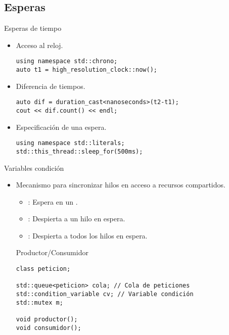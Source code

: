 \subsection{Esperas}

\begin{frame}[t,fragile]{Esperas de tiempo}
\begin{itemize}
  \item Acceso al reloj.
\begin{lstlisting}
using namespace std::chrono;
auto t1 = high_resolution_clock::now();
\end{lstlisting}
  \item Diferencia de tiempos.
\begin{lstlisting}
auto dif = duration_cast<nanoseconds>(t2-t1);
cout << dif.count() << endl;
\end{lstlisting}
  \item Especificación de una espera.
\begin{lstlisting}
using namespace std::literals;
std::this_thread::sleep_for(500ms);
\end{lstlisting}
\end{itemize}
\end{frame}

\begin{frame}[t,fragile]{Variables condición}
\begin{itemize}
  \item Mecanismo para sincronizar hilos en acceso a recursos compartidos.
    \begin{itemize}
      \item {}: Espera en un .
      \item {}: Despierta a un hilo en espera.
      \item {}: Despierta a todos los hilos en espera.
    \end{itemize}
\begin{block}{Productor/Consumidor}
\begin{lstlisting}
class peticion;

std::queue<peticion> cola; // Cola de peticiones
std::condition_variable cv; // Variable condición
std::mutex m;

void productor();
void consumidor();
\end{lstlisting}
\end{block}
\end{itemize}
\end{frame}

